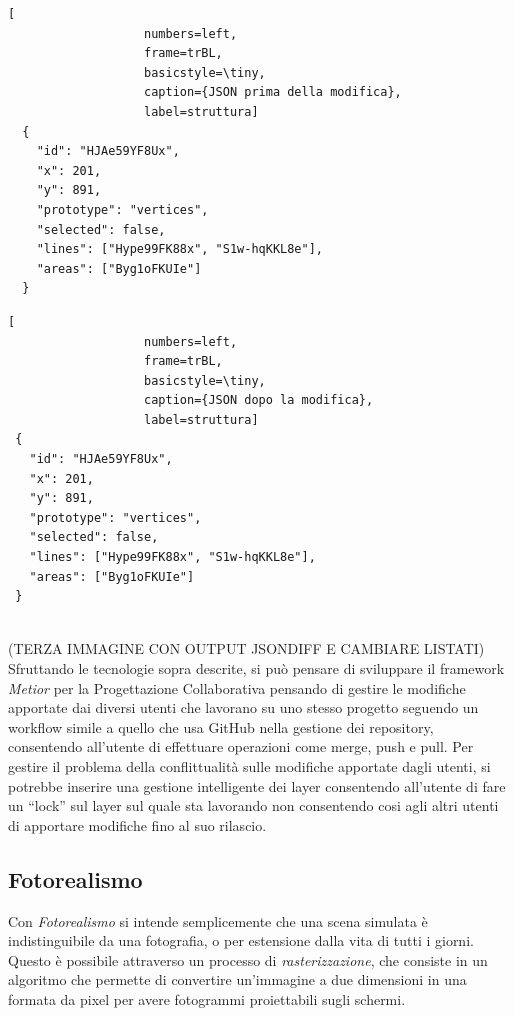 \noindent
\begin{minipage}{.45\textwidth}
\begin{lstlisting}[
                   numbers=left,
                   frame=trBL,
                   basicstyle=\tiny,
                   caption={JSON prima della modifica},
                   label=struttura]
  {
    "id": "HJAe59YF8Ux",
    "x": 201,
    "y": 891,
    "prototype": "vertices",
    "selected": false,
    "lines": ["Hype99FK88x", "S1w-hqKKL8e"],
    "areas": ["Byg1oFKUIe"]
  }
\end{lstlisting}
\end{minipage}\hfill
\begin{minipage}{.45\textwidth}
\begin{lstlisting}[
                   numbers=left,
                   frame=trBL,
                   basicstyle=\tiny,
                   caption={JSON dopo la modifica},
                   label=struttura]
 {
   "id": "HJAe59YF8Ux",
   "x": 201,
   "y": 891,
   "prototype": "vertices",
   "selected": false,
   "lines": ["Hype99FK88x", "S1w-hqKKL8e"],
   "areas": ["Byg1oFKUIe"]
 }
\end{lstlisting}
\end{minipage}\\

(TERZA IMMAGINE CON OUTPUT JSONDIFF E CAMBIARE LISTATI)\\
Sfruttando le tecnologie sopra descrite, si può pensare di sviluppare il framework \emph{Metior}
per la Progettazione Collaborativa pensando di gestire le modifiche apportate dai diversi utenti che lavorano su uno
stesso progetto seguendo un workflow simile a quello che usa GitHub nella gestione dei repository,
consentendo all'utente di effettuare operazioni come merge, push e pull.
Per gestire il problema della conflittualità sulle modifiche apportate dagli utenti,
si potrebbe inserire una gestione intelligente dei layer consentendo all'utente di fare un ``lock'' sul layer sul quale
sta lavorando non consentendo cosi agli altri utenti di apportare modifiche fino al suo rilascio.
\newpage

\subsection{Fotorealismo}
\label{sec:conclusions_section_2_sub_3}
Con \emph{Fotorealismo} si intende semplicemente che una scena simulata \`e indistinguibile da una fotografia, o per estensione
dalla vita di tutti i giorni. Questo è possibile attraverso un processo di \emph{rasterizzazione}, che consiste in un algoritmo che
permette di convertire un'immagine a due dimensioni in una formata da pixel per avere fotogrammi proiettabili sugli schermi.


